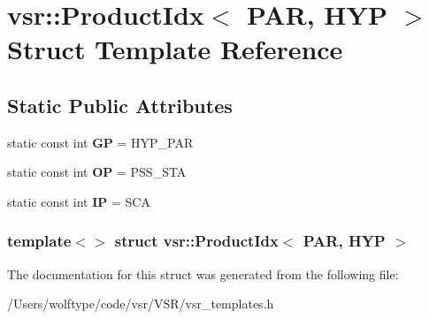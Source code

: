\hypertarget{structvsr_1_1_product_idx_3_01_p_a_r_00_01_h_y_p_01_4}{\section{vsr\-:\-:Product\-Idx$<$ P\-A\-R, H\-Y\-P $>$ Struct Template Reference}
\label{structvsr_1_1_product_idx_3_01_p_a_r_00_01_h_y_p_01_4}
}
\subsection*{Static Public Attributes}
\begin{DoxyCompactItemize}
\item 
\hypertarget{structvsr_1_1_product_idx_3_01_p_a_r_00_01_h_y_p_01_4_a4af881b9e75934bee24aea1edb867bd5}{static const int {\bfseries G\-P} = H\-Y\-P\-\_\-\-P\-A\-R}\label{structvsr_1_1_product_idx_3_01_p_a_r_00_01_h_y_p_01_4_a4af881b9e75934bee24aea1edb867bd5}

\item 
\hypertarget{structvsr_1_1_product_idx_3_01_p_a_r_00_01_h_y_p_01_4_aebfb5d97c960dfb74c4ceac10f3102bc}{static const int {\bfseries O\-P} = P\-S\-S\-\_\-\-S\-T\-A}\label{structvsr_1_1_product_idx_3_01_p_a_r_00_01_h_y_p_01_4_aebfb5d97c960dfb74c4ceac10f3102bc}

\item 
\hypertarget{structvsr_1_1_product_idx_3_01_p_a_r_00_01_h_y_p_01_4_a38ccbdd06313e2929b548ecf5e57b140}{static const int {\bfseries I\-P} = S\-C\-A}\label{structvsr_1_1_product_idx_3_01_p_a_r_00_01_h_y_p_01_4_a38ccbdd06313e2929b548ecf5e57b140}

\end{DoxyCompactItemize}
\subsubsection*{template$<$$>$ struct vsr\-::\-Product\-Idx$<$ P\-A\-R, H\-Y\-P $>$}



The documentation for this struct was generated from the following file\-:\begin{DoxyCompactItemize}
\item 
/\-Users/wolftype/code/vsr/\-V\-S\-R/vsr\-\_\-templates.\-h\end{DoxyCompactItemize}
